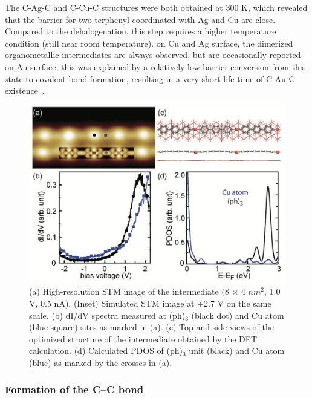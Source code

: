 \documentclass[%
 reprint,
 amsmath,amssymb,
 aps,
prb,
]{revtex4-2}
\begin{document}
The C-Ag-C and C-Cu-C structures were both obtained at 300 K, which revealed that the barrier for two terphenyl
coordinated with Ag and Cu are close. Compared to the dehalogenation, this step requires a higher temperature condition (still near room temperature). on Cu and Ag surface, the dimerized organometallic intermediates are always observed, but are occasionally reported on Au surface, this was explained by a relatively low barrier conversion from this state to covalent bond formation, resulting in a very short life time of C-Au-C existence~\cite{ullmann_33}.
%
\begin{figure}[ht]
\centering
\includegraphics[width=0.75\columnwidth]{Fig/Organometallic.png}
\caption{(a) High-resolution STM image of the intermediate (8 $\times$ 4 $nm^2$, 1.0 V, 0.5 nA). (Inset) Simulated STM image at +2.7 V on the same scale. (b) dI/dV spectra measured at (ph)$_3$ (black dot) and Cu atom (blue square) sites as marked in (a). (c) Top and side views of the optimized structure of the intermediate obtained by the DFT calculation. (d) Calculated PDOS of (ph)$_3$ unit (black) and Cu atom (blue) as marked by the crosses in (a).}
\label{fig:organ}
\end{figure}

\subsubsection{Formation of the C--C bond}
\end{document}
